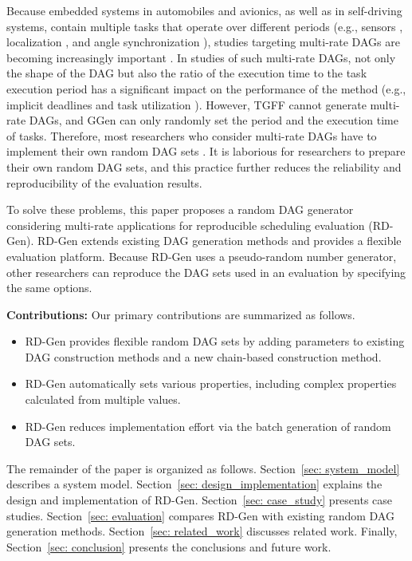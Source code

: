 Because embedded systems in automobiles and avionics, as well as in self-driving systems, contain multiple tasks that operate over different periods (e.g., sensors \cite{guanindustry}, localization \cite{verucchi2020latency}, and angle synchronization \cite{hamann2017communication}), studies targeting multi-rate DAGs are becoming increasingly important \cite{gunzel2021suspension, kordon2020evaluation}.
In studies of such multi-rate DAGs, not only the shape of the DAG but also the ratio of the execution time to the task execution period has a significant impact on the performance of the method (e.g., implicit deadlines \cite{ueter2021hard, cho2021conditionally} and task utilization \cite{nogd2020response, yang2020mixed}).
However, TGFF cannot generate multi-rate DAGs, and GGen can only randomly set the period and the execution time of tasks.
Therefore, most researchers who consider multi-rate DAGs have to implement their own random DAG sets \cite{voronov2021ai, dong2019efficient, yang2020mixed, nogd2020response}.
It is laborious for researchers to prepare their own random DAG sets, and this practice further reduces the reliability and reproducibility of the evaluation results.

To solve these problems, this paper proposes a random DAG generator considering multi-rate applications for reproducible scheduling evaluation (RD-Gen).
RD-Gen extends existing DAG generation methods and provides a flexible evaluation platform.
Because RD-Gen uses a pseudo-random number generator, other researchers can reproduce the DAG sets used in an evaluation by specifying the same options.

\textbf{Contributions: } Our primary contributions are summarized as follows.
\begin{itemize}
    \item RD-Gen provides flexible random DAG sets by adding parameters to existing DAG construction methods and a new chain-based construction method.
    \item RD-Gen automatically sets various properties, including complex properties calculated from multiple values.
    \item RD-Gen reduces implementation effort via the batch generation of random DAG sets.
\end{itemize}

The remainder of the paper is organized as follows.
Section~\ref{sec: system_model} describes a system model.
Section~\ref{sec: design_implementation} explains the design and implementation of RD-Gen.
Section~\ref{sec: case_study} presents case studies.
Section~\ref{sec: evaluation} compares RD-Gen with existing random DAG generation methods.
Section~\ref{sec: related_work} discusses related work.
Finally, Section~\ref{sec: conclusion} presents the conclusions and future work.
